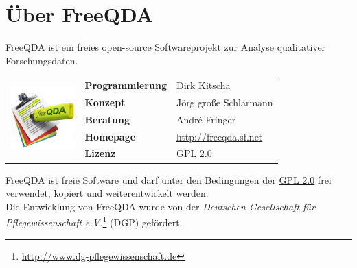 \chapter{Über FreeQDA}
FreeQDA ist ein freies open-source Softwareprojekt zur Analyse qualitativer Forschungsdaten.


\begin{table}[!h]
\centering
\begin{tabular}{p{30mm}p{40mm}|p{60mm}}
\multirow{5}{*}{\includegraphics[width=25mm]{img/freeQDA_FINAL_1024}} & \textbf{Programmierung} & Dirk Kitscha	\\
&\textbf{Konzept} & Jörg große Schlarmann	\\
&\textbf{Beratung} & André Fringer		\\
&\textbf{Homepage} & \url{http://freeqda.sf.net} \\
&\textbf{Lizenz} & \href{http://www.gnu.org/licenses/gpl-2.0.html}{GPL 2.0}		\\
\end{tabular}
\label{tab:about}
\end{table}
\vfill
FreeQDA ist freie Software und darf unter den Bedingungen der \href{http://www.gnu.org/licenses/gpl-2.0.html}{GPL 2.0} %
frei verwendet, kopiert und weiterentwickelt werden.\\
Die Entwicklung von FreeQDA wurde von der \textit{Deutschen Gesellschaft für Pflegewissenschaft e.V.}\footnote{\url{http://www.dg-pflegewissenschaft.de}} %
(DGP) gefördert.
\vfill